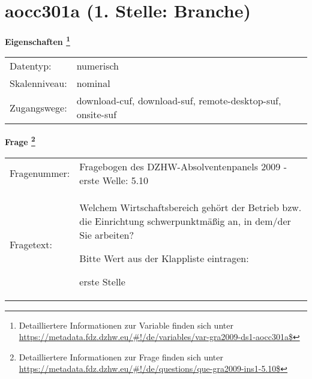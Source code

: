 
    \setcounter{footnote}{0}

    \vspace*{-1.8cm}
	\section{aocc301a (1. Stelle: Branche)}
	\label{section:aocc301a}



    \vspace*{0.5cm}
    \noindent\textbf{Eigenschaften
	\footnote{Detailliertere Informationen zur Variable finden sich unter
		\url{https://metadata.fdz.dzhw.eu/\#!/de/variables/var-gra2009-ds1-aocc301a$}}}\\
	\begin{tabularx}{\hsize}{@{}lX}
	Datentyp: & numerisch \\
	Skalenniveau: & nominal \\
	Zugangswege: &
	  download-cuf, 
	  download-suf, 
	  remote-desktop-suf, 
	  onsite-suf
 \\
    \end{tabularx}



				\vspace*{0.5cm}
                \noindent\textbf{Frage
	                \footnote{Detailliertere Informationen zur Frage finden sich unter
		              \url{https://metadata.fdz.dzhw.eu/\#!/de/questions/que-gra2009-ins1-5.10$}}}\\
				\begin{tabularx}{\hsize}{@{}lX}
					Fragenummer: &
					  Fragebogen des DZHW-Absolventenpanels 2009 - erste Welle:
					  5.10
 \\
					Fragetext: & Welchem Wirtschaftsbereich gehört der Betrieb bzw. die Einrichtung schwerpunktmäßig an, in dem/der Sie arbeiten?\par  Bitte Wert aus der Klappliste eintragen:\par  erste Stelle \\
				\end{tabularx}





